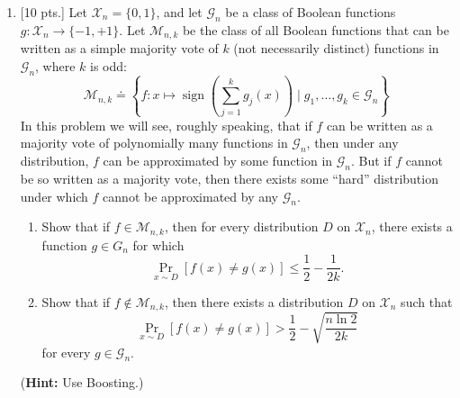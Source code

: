 \documentclass[12pt,letterpaper]{article}
\newenvironment{solution}{%
  \begin{proof}[Solution]$ $\par\nobreak\ignorespaces
}{%
  \end{proof}
}
\def \x{\boldsymbol{x}}
\def \hint{\textbf{Hint: }}
\begin{document}
\begin{enumerate}
\begin{solution}
  \textbf{Step 2:} Suppose the statement is true for $t\leq k$, then for $t=k+1$, $\varepsilon_{k+1}=\sum_{\bm{x}:x_{k+1}=-1}D^{(k+1)}_{\x}=\frac{1}{Z_{k}}\sum_{\x: x_{k+1}=-1,x_{k}=1}D_{\x}^{(k)}D_{\x}^{(t)}\sqrt{\frac{1/2+\gamma}{1/2-\gamma}}+\frac{1}{Z_{k}}\sum_{\x:x_{k+1}=-1,x_{k}=-1}\sqrt{\frac{1/2-\gamma}{1/2+\gamma}}$. Also by trivial inductio we see that $Z_{t}=\frac{1}{2}(\sqrt{\frac{1/2+\gamma}{1/2-\gamma}}+\sqrt{\frac{1/2-\gamma}{1/2+\gamma}})$, so by induction hypothesis $\varepsilon_{(k+1)}=2(\frac{1}{2}-\gamma)\cdot\frac{1}{2}=\frac{1}{2}-\gamma$. The last $\frac{1}{2}$ comes from the fact that exactly half of the sample points with the same distribution w.r.t. first $k$ coordinates are in the sum.
\end{solution}

\item {[10 pts.]} Let $\mathcal{X}_{n}=\{0,1\}$, and let $\mathcal{G}_{n}$ be a class of Boolean functions $ g: \mathcal{X}_{n} \rightarrow\{-1,+1\}$. Let $\mathcal{M}_{n, k}$  be the class of all Boolean functions that can be written as a simple majority vote of $k$ (not necessarily distinct) functions in $\mathcal G_{n}$, where $k$ is odd:
$$
\mathcal{M}_{n, k} \doteq\left\{f: x \mapsto \operatorname{sign}\left(\sum_{j=1}^{k} g_{j}(x)\right) \mid g_{1}, \ldots, g_{k} \in \mathcal{G}_{n}\right\}
$$
In this problem we will see, roughly speaking, that if $f$ can be written as a majority vote of polynomially many functions in $\mathcal G_{n}$, then under any distribution, $f$ can be approximated by some function in $\mathcal G_{n}$. But if $f$ cannot be so written as a majority vote, then there exists some ``hard'' distribution under which $f$ cannot be approximated by any $\mathcal{G}_{n}$.
\begin{enumerate}[label=(\alph*)]
    \item  Show that if $f \in \mathcal{M}_{n, k}$, then for every distribution $D$ on $\mathcal{X}_{n}$, there exists a function $ g \in G_{n}$ for which
\[
\Pr_{x \sim D}[f(x) \neq g(x)] \leq \frac{1}{2}-\frac{1}{2 k} .
\]
    \item Show that if $f \notin \mathcal{M}_{n, k}$, then there exists a distribution $D$ on $\mathcal{X}_{n}$ such that 
\[
\Pr_{x \sim D}[f(x) \neq g(x)]>\frac{1}{2}-\sqrt{\frac{n \ln 2}{2 k}}
\]
for every $g \in \mathcal{G}_{n}$.
\end{enumerate}
(\hint Use Boosting.)



\end{enumerate}
\end{document}
